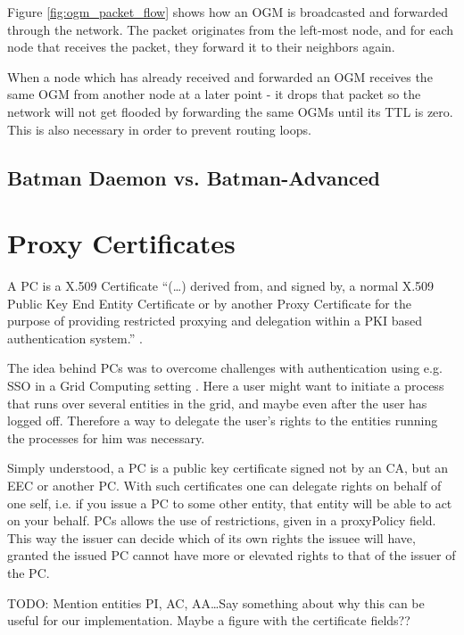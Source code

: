 Figure \ref{fig:ogm_packet_flow} shows how an \ac{OGM} is broadcasted and
forwarded through the network. The packet originates from the left-most node,
and for each node that receives the packet, they forward it to their neighbors
again.

When a node which has already received and forwarded an \ac{OGM} receives the
same \ac{OGM} from another node at a later point - it drops that packet so the
network will not get flooded by forwarding the same \acp{OGM} until its \ac{TTL}
is zero. This is also necessary in order to prevent routing loops.

\subsection{Batman Daemon vs. Batman-Advanced}

\section{Proxy Certificates}
\label{sect:pc}
A \acf{PC} is a X.509 Certificate ``(\ldots) derived from, and signed by, a
normal X.509 Public Key End Entity Certificate or by another Proxy Certificate
for the purpose of providing restricted proxying and delegation within a PKI
based authentication system.'' \cite{rfc3820}.

The idea behind \acp{PC} was to overcome challenges with authentication
using e.g. \ac{SSO} in a Grid Computing setting \cite{foster1998security}. Here
a user might want to initiate a process that runs over several entities in the
grid, and maybe even after the user has logged off. Therefore a way to delegate
the user's rights to the entities running the processes for him was necessary.

Simply understood, a \ac{PC} is a public key certificate signed not
by an \ac{CA}, but an \ac{EEC} or another \ac{PC}. With such certificates one
can delegate rights on behalf of one self, i.e. if you issue a \ac{PC} to some
other entity, that entity will be able to act on your behalf. \acp{PC} allows
the use of restrictions, given in a proxyPolicy field. This way the issuer can
decide which of its own rights the issuee will have, granted the issued \ac{PC}
cannot have more or elevated rights to that of the issuer of the \ac{PC}.

TODO: Mention entities PI, AC, AA\ldots Say something about why this can be
useful for our implementation. Maybe a figure with the certificate fields??


